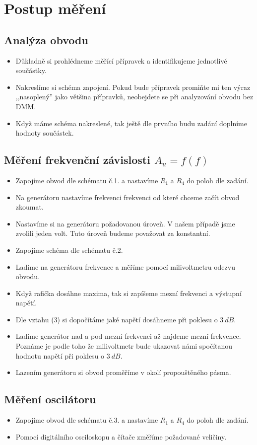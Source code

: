 \section*{Postup měření}
  \subsection*{Analýza obvodu}
    \begin{itemize}
      \item
        Důkladně si prohlédneme měřící přípravek a identifikujeme jednotlivé součástky.
      \item
      	Nakreslíme si schéma zapojení. Pokud bude přípravek promiňte mi ten výraz ,,nasoplený'' jako většina přípravků, neobejdete se při analyzování obvodu bez DMM.
      \item
      	Když máme schéma nakreslené, tak ještě dle prvního budu zadání doplníme hodnoty součástek.
	\end{itemize}
		
  \subsection*{Měření frekvenční závislosti $A_u = f(f)$}
    \begin{itemize}
      \item
        Zapojíme obvod dle schématu č.1. a nastavíme $R_1$ a $R_4$ do poloh dle zadání.
	  \item
	  	Na generátoru nastavíme frekvenci frekvenci od které chceme začít obvod zkoumat.
      \item
      	Nastavíme si na generátoru požadovanou úroveň. V našem případě jsme zvolili jeden volt. Tuto úroveň budeme považovat za konstantní.
      \item
      	Zapojíme schéma dle schématu č.2.
      \item
      	Ladíme na generátoru frekvence a měříme pomocí milivoltmetru odezvu obvodu.
      \item
      	Když rafička dosáhne maxima, tak si zapíšeme mezní frekvenci a výstupní napětí.
      \item
      	Dle vztahu (3) si dopočítáme jaké napětí dosáhneme při poklesu o $3~dB$.
      \item
      	Ladíme generátor nad a pod mezní frekvenci až najdeme mezní frekvence. Poznáme je podle toho že milivoltmetr bude ukazovat námi spočítanou hodnotu napětí při poklesu o $3~dB$.
      \item
        Lazením generátoru si obvod proměříme v okolí propouštěného pásma.
	\end{itemize}
	
	\subsection*{Měření oscilátoru}
    \begin{itemize}
      \item
        Zapojíme obvod dle schématu č.3. a nastavíme $R_1$ a $R_4$ do poloh dle zadání.
	  \item
	  	Pomocí digitálního osciloskopu a čítače změříme požadované veličiny.     
	\end{itemize}
		
 
